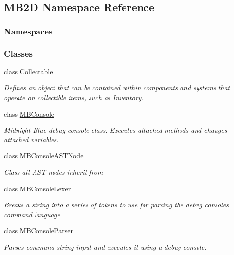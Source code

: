\hypertarget{namespace_m_b2_d}{}\subsection{M\+B2D Namespace Reference}
\label{namespace_m_b2_d}
\subsubsection*{Namespaces}
\begin{DoxyCompactItemize}
\end{DoxyCompactItemize}
\subsubsection*{Classes}
\begin{DoxyCompactItemize}
\item 
class \hyperlink{class_m_b2_d_1_1_collectable}{Collectable}
\begin{DoxyCompactList}\small\item\em Defines an object that can be contained within components and systems that operate on collectible items, such as Inventory. \end{DoxyCompactList}\item 
class \hyperlink{class_m_b2_d_1_1_m_b_console}{M\+B\+Console}
\begin{DoxyCompactList}\small\item\em Midnight Blue debug console class. Executes attached methods and changes attached variables. \end{DoxyCompactList}\item 
class \hyperlink{class_m_b2_d_1_1_m_b_console_a_s_t_node}{M\+B\+Console\+A\+S\+T\+Node}
\begin{DoxyCompactList}\small\item\em Class all A\+ST nodes inherit from \end{DoxyCompactList}\item 
class \hyperlink{class_m_b2_d_1_1_m_b_console_lexer}{M\+B\+Console\+Lexer}
\begin{DoxyCompactList}\small\item\em Breaks a string into a series of tokens to use for parsing the debug consoles command language \end{DoxyCompactList}\item 
class \hyperlink{class_m_b2_d_1_1_m_b_console_parser}{M\+B\+Console\+Parser}
\begin{DoxyCompactList}\small\item\em Parses command string input and executes it using a debug console. \end{DoxyCompactList}\item 

\end{DoxyCompactItemize}

